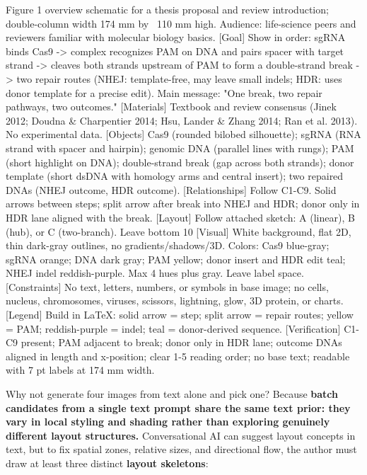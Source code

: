 \begin{Prompt}
 Figure 1 overview schematic for a thesis proposal and review introduction; double-column width 174 mm by ~110 mm high. Audience: life-science peers and reviewers familiar with molecular biology basics.
[Goal] Show in order: sgRNA binds Cas9 -> complex recognizes PAM on DNA and pairs spacer with target strand -> cleaves both strands upstream of PAM to form a double-strand break -> two repair routes (NHEJ: template-free, may leave small indels; HDR: uses donor template for a precise edit). Main message: "One break, two repair pathways, two outcomes."
[Materials] Textbook and review consensus (Jinek 2012; Doudna & Charpentier 2014; Hsu, Lander & Zhang 2014; Ran et al. 2013). No experimental data.
[Objects] Cas9 (rounded bilobed silhouette); sgRNA (RNA strand with spacer and hairpin); genomic DNA (parallel lines with rungs); PAM (short highlight on DNA); double-strand break (gap across both strands); donor template (short dsDNA with homology arms and central insert); two repaired DNAs (NHEJ outcome, HDR outcome).
[Relationships] Follow C1-C9. Solid arrows between steps; split arrow after break into NHEJ and HDR; donor only in HDR lane aligned with the break.
[Layout] Follow attached sketch: A (linear), B (hub), or C (two-branch). Leave bottom 10%
[Visual] White background, flat 2D, thin dark-gray outlines, no gradients/shadows/3D. Colors: Cas9 blue-gray; sgRNA orange; DNA dark gray; PAM yellow; donor insert and HDR edit teal; NHEJ indel reddish-purple. Max 4 hues plus gray. Leave label space.
[Constraints] No text, letters, numbers, or symbols in base image; no cells, nucleus, chromosomes, viruses, scissors, lightning, glow, 3D protein, or charts.
[Legend] Build in LaTeX: solid arrow = step; split arrow = repair routes; yellow = PAM; reddish-purple = indel; teal = donor-derived sequence.
[Verification] C1-C9 present; PAM adjacent to break; donor only in HDR lane; outcome DNAs aligned in length and x-position; clear 1-5 reading order; no base text; readable with 7 pt labels at 174 mm width.
\end{Prompt}

Why not generate four images from text alone and pick one? Because \textbf{batch candidates from a single text prompt share the same text prior: they vary in local styling and shading rather than exploring genuinely different layout structures.} Conversational AI can suggest layout concepts in text, but to fix spatial zones, relative sizes, and directional flow, the author must draw at least three distinct \textbf{layout skeletons}:

